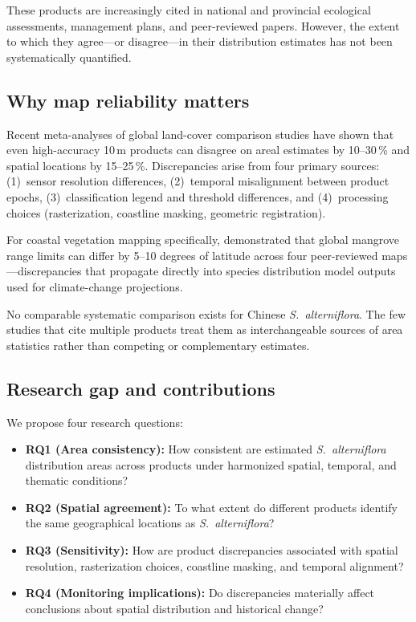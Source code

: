 \documentclass[11pt]{article}
\begin{document}
These products are increasingly cited in national and provincial ecological
assessments, management plans, and peer-reviewed papers. However, the extent
to which they agree---or disagree---in their distribution estimates has not been
systematically quantified.

\subsection{Why map reliability matters}

Recent meta-analyses of global land-cover comparison studies
\citep{wang_2024_ijde, zhao_2023_rs, xu_2024_rse} have shown that even high-accuracy
10\,m products can disagree on areal estimates by 10--30\,\% and spatial
locations by 15--25\,\%. Discrepancies arise from four primary sources:
(1)~sensor resolution differences, (2)~temporal misalignment between product
epochs, (3)~classification legend and threshold differences, and
(4)~processing choices (rasterization, coastline masking, geometric
registration).

For coastal vegetation mapping specifically, \citet{ximenes_2023_stoten}
demonstrated that global mangrove range limits can differ by 5--10 degrees of
latitude across four peer-reviewed maps---discrepancies that propagate directly
into species distribution model outputs used for climate-change projections.

No comparable systematic comparison exists for Chinese \textit{S.~alterniflora}.
The few studies that cite multiple products treat them as interchangeable sources
of area statistics rather than competing or complementary estimates.

\subsection{Research gap and contributions}

We propose four research questions:

\begin{itemize}[nosep]
\item \textbf{RQ1 (Area consistency):} How consistent are estimated
  \textit{S.~alterniflora} distribution areas across products under harmonized
  spatial, temporal, and thematic conditions?
\item \textbf{RQ2 (Spatial agreement):} To what extent do different products
  identify the same geographical locations as \textit{S.~alterniflora}?
\item \textbf{RQ3 (Sensitivity):} How are product discrepancies associated with
  spatial resolution, rasterization choices, coastline masking, and temporal
  alignment?
\item \textbf{RQ4 (Monitoring implications):} Do discrepancies materially affect
  conclusions about spatial distribution and historical change?
\end{itemize}
\end{document}
